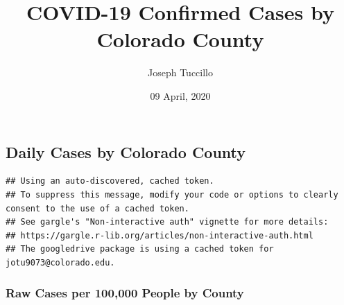 \documentclass[]{article}
\title{COVID-19 Confirmed Cases by Colorado County}
\author{Joseph Tuccillo}
\date{09 April, 2020}
\newenvironment{Shaded}{\begin{snugshade}}{\end{snugshade}}
\newcommand{\CommentTok}[1]{\textcolor[rgb]{0.56,0.35,0.01}{\textit{#1}}}
\newcommand{\DataTypeTok}[1]{\textcolor[rgb]{0.13,0.29,0.53}{#1}}
\newcommand{\KeywordTok}[1]{\textcolor[rgb]{0.13,0.29,0.53}{\textbf{#1}}}
\newcommand{\NormalTok}[1]{#1}
\newcommand{\OperatorTok}[1]{\textcolor[rgb]{0.81,0.36,0.00}{\textbf{#1}}}
\newcommand{\OtherTok}[1]{\textcolor[rgb]{0.56,0.35,0.01}{#1}}
\newcommand{\StringTok}[1]{\textcolor[rgb]{0.31,0.60,0.02}{#1}}
\begin{document}
\maketitle

\begin{Shaded}
\end{Shaded}

\hypertarget{daily-cases-by-colorado-county}{%
\subsection{Daily Cases by Colorado
County}\label{daily-cases-by-colorado-county}}

\begin{verbatim}
## Using an auto-discovered, cached token.
## To suppress this message, modify your code or options to clearly consent to the use of a cached token.
## See gargle's "Non-interactive auth" vignette for more details:
## https://gargle.r-lib.org/articles/non-interactive-auth.html
## The googledrive package is using a cached token for jotu9073@colorado.edu.
\end{verbatim}

\hypertarget{raw-cases-per-100000-people-by-county}{%
\subsubsection{Raw Cases per 100,000 People by
County}\label{raw-cases-per-100000-people-by-county}}
\end{document}
